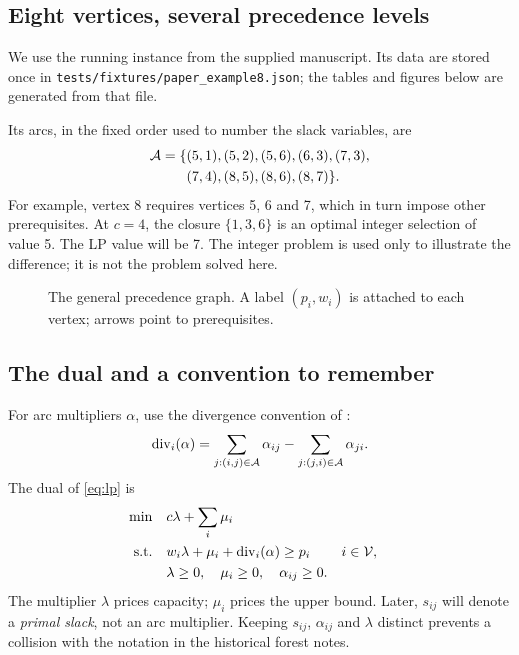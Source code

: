 \subsection{Eight vertices, several precedence levels}
We use the running instance from the supplied manuscript. Its data are
stored once in \texttt{tests/fixtures/paper\_example8.json}; the tables and
figures below are generated from that file.
\begin{table}[htbp]
\centering
\caption{Profits and weights of the running instance.}\label{tab:data}
\end{table}
Its arcs, in the fixed order used to number the slack variables, are
\begin{equation}\label{eq:arcs}
\begin{split}
\mathcal A=\{&(5,1),(5,2),(5,6),(6,3),(7,3),\\
         &(7,4),(8,5),(8,6),(8,7)\}.
\end{split}
\end{equation}
For example, vertex 8 requires vertices 5, 6 and 7, which in turn impose other
prerequisites. At $c=4$, the closure $\{1,3,6\}$ is an optimal integer
selection of value 5. The LP value will be 7. The integer problem is used
only to illustrate the difference; it is not the problem solved here.
\begin{figure}[htbp]
\centering
\caption{The general precedence graph. A label $(p_i,w_i)$ is attached to
each vertex; arrows point to prerequisites.}\label{fig:graph}
\end{figure}

\subsection{The dual and a convention to remember}
For arc multipliers $\alpha$, use the divergence convention of
\citet{DoseFuriniLocatelli2026}:
\[
\operatorname{div}_i(\alpha)=\sum_{j:(i,j)\in\mathcal A}\alpha_{ij}
                  -\sum_{j:(j,i)\in\mathcal A}\alpha_{ji}.
\]
The dual of \eqref{eq:lp} is
\begin{equation}\label{eq:lpdual}
\begin{aligned}
\min\quad &c\lambda+\sum_i\mu_i\\
\text{s.t.}\quad &w_i\lambda+\mu_i+\operatorname{div}_i(\alpha)\ge p_i &&i\in\mathcal V,\\
&\lambda\ge0,\quad\mu_i\ge0,\quad\alpha_{ij}\ge0.
\end{aligned}
\end{equation}
The multiplier $\lambda$ prices capacity; $\mu_i$ prices the upper bound.
Later, $s_{ij}$ will denote a \emph{primal slack}, not an arc multiplier.
Keeping $s_{ij}$, $\alpha_{ij}$ and $\lambda$ distinct prevents a collision
with the notation in the historical forest notes.


